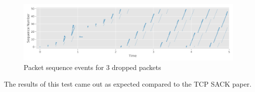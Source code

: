 \documentclass[fleqn,11pt]{article}
\begin{document}
\begin{figure}[!htb]
  \centering
  \includegraphics[width=13cm]{../graphs/3-sequence.png}
  \caption{Packet sequence events for 3 dropped packets}

  \label{fig:throughput}
\end{figure}

The results of this test came out as expected compared to the TCP SACK paper.
\end{document}
